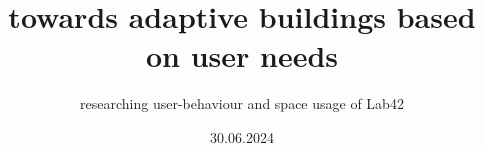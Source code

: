 \title{towards adaptive buildings based on user needs}
\subtitle{researching user-behaviour and space usage of Lab42}

\date{30.06.2024}